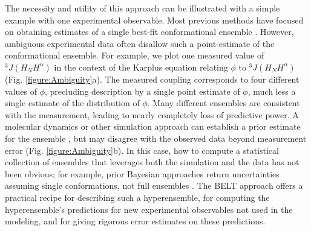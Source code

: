 \documentclass[journal=jacsat,manuscript=article]{achemso}
\begin{document}
The necessity and utility of this approach can be illustrated with a simple example with one experimental observable. Most previous methods have focused on obtaining estimates of a single best-fit conformational ensemble  \cite{rozycki2011saxs,  Graf2007, chodera2012}.  However, ambiguous experimental data often disallow such a point-estimate of the conformational ensemble.  For example, we plot one measured  \cite{Graf2007} value of $^3J(H_NH^\alpha)$ in the context of the Karplus \cite{vogeli2007limits} equation relating $\phi$ to $^3J(H_NH^\alpha)$ (Fig. \ref{figure:Ambiguity}a).  The measured coupling corresponds to four different values of $\phi$, precluding description by a single point estimate of $\phi$, much less a single estimate of the distribution of $\phi$. Many different ensembles are consistent with the measurement, leading to nearly completely loss of predictive power. A molecular dynamics or other simulation approach can establish a prior estimate for the ensemble , but may disagree with the observed data beyond measurement error (Fig. \ref{figure:Ambiguity}b). In this case, how to compute a statistical collection of ensembles that leverages both the simulation and the data has not been obvious; for example, prior Bayesian approaches return uncertainties assuming single conformations, not full ensembles \cite{something}.  The BELT approach offers a practical recipe for describing such a hyperensemble, for computing the hyperensemble's predictions for new experimental observables not used in the modeling, and for giving rigorous error estimates on these predictions.
\end{document}
